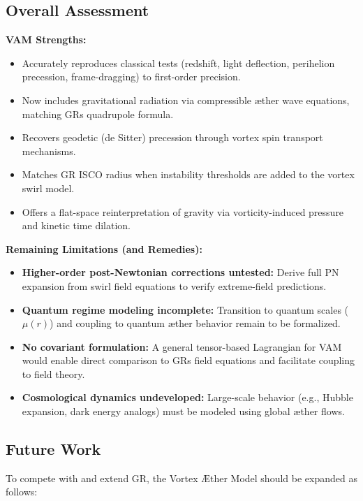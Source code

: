 \vspace{1em}

\subsection*{Overall Assessment}

\textbf{VAM Strengths:}
\begin{itemize}
    \item Accurately reproduces classical tests (redshift, light deflection, perihelion precession, frame-dragging) to first-order precision.
    \item Now includes gravitational radiation via compressible æther wave equations, matching GR\rqs s quadrupole formula.
    \item Recovers geodetic (de Sitter) precession through vortex spin transport mechanisms.
    \item Matches GR ISCO radius when instability thresholds are added to the vortex swirl model.
    \item Offers a flat-space reinterpretation of gravity via vorticity-induced pressure and kinetic time dilation.
\end{itemize}

\textbf{Remaining Limitations (and Remedies):}
\begin{itemize}
    \item \textbf{Higher-order post-Newtonian corrections untested:} Derive full PN expansion from swirl field equations to verify extreme-field predictions.
    \item \textbf{Quantum regime modeling incomplete:} Transition to quantum scales (\( \mu(r) \)) and coupling to quantum æther behavior remain to be formalized.
    \item \textbf{No covariant formulation:} A general tensor-based Lagrangian for VAM would enable direct comparison to GR\rqs s field equations and facilitate coupling to field theory.
    \item \textbf{Cosmological dynamics undeveloped:} Large-scale behavior (e.g., Hubble expansion, dark energy analogs) must be modeled using global æther flows.
\end{itemize}

\subsection*{Future Work}

To compete with and extend GR, the Vortex Æther Model should be expanded as follows:

